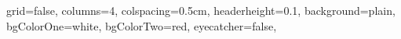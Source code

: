 \documentclass[a0paper,landscape]{baposter}
\begin{document}
\begin{poster}{
%
%
%
%
%        
%
%
%
%
grid=false,
columns=4,
colspacing=0.5cm,
headerheight=0.1\textheight,
background=plain,
bgColorOne=white,
bgColorTwo=red,
eyecatcher=false,
 
}
\end{poster}
\end{document}
